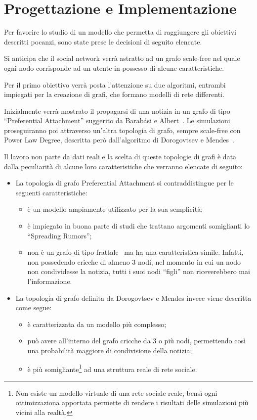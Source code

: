 \section{Progettazione e Implementazione}
\label{section:progettazione}


Per favorire lo studio di un modello che permetta di raggiungere gli obiettivi descritti 
pocanzi, sono state prese le decisioni di seguito elencate.

Si anticipa che il social network verrà astratto ad un grafo scale-free nel quale ogni 
nodo corrisponde ad un utente in possesso di alcune caratteristiche.

Per il primo obiettivo verrà posta l'attenzione su due algoritmi, entrambi impiegati per la creazione di grafi, 
che formano modelli di rete differenti.

Inizialmente verrà mostrato il propagarsi di una notizia in un grafo di tipo 
``Preferential Attachment'' suggerito da Barabási e Albert~\cite{biblio:barabasilab_emergence}.
Le simulazioni proseguiranno poi attraverso un'altra topologia di grafo, sempre scale-free 
con Power Law Degree, descritta però dall'algoritmo di Dorogovtsev e Mendes~\cite{biblio:evolution_networks}.

Il lavoro non parte da dati reali e la scelta di queste topologie di grafi è data 
dalla peculiarità di alcune loro caratteristiche che verranno elencate di seguito:
\begin{itemize}
 \item La topologia di grafo Preferential Attachment si contraddistingue per le seguenti caratteristiche:
 \begin{itemize}
  \item è un modello ampiamente utilizzato per la sua semplicità;
  \item è impiegato in buona parte di studi che trattano argomenti somiglianti lo ``Spreading Rumors'';
  \item non è un grafo di tipo frattale~\cite{biblio:fractal_resistant_disease} ma ha una caratteristica simile. 		%
 Infatti, non possedendo cricche di almeno 3 nodi, nel momento in cui un nodo non condividesse la notizia, 
 tutti i suoi nodi ``figli'' non riceverebbero mai l'informazione.
 \end{itemize}
 
 \item La topologia di grafo definita da Dorogovtsev e Mendes invece viene descritta come segue:
  \begin{itemize}
  \item è caratterizzata da un modello più complesso;
  \item può avere all'interno del grafo cricche da 3 o più nodi, permettendo così una probabilità maggiore di condivisione della notizia;
  \item è più somigliante\footnote{\scriptsize Non esiste un modello virtuale di una rete sociale reale, 
  bensì ogni ottimizzaziona apportata permette di rendere i risultati delle simulazioni più vicini alla realtà.}
  ad una struttura reale di rete sociale.
 \end{itemize}
\end{itemize}

